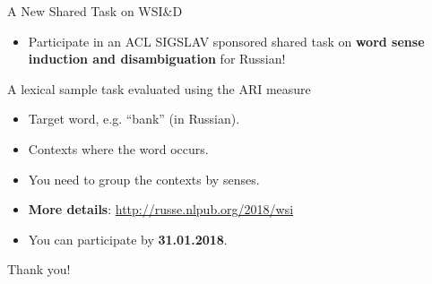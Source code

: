 \documentclass{beamer}
\begin{document}
\begin{frame}{A New Shared Task on WSI\&D}
  
  \begin{itemize}
  \item Participate in an ACL SIGSLAV sponsored shared task on \textbf{word sense induction and disambiguation} for Russian!
  
  
 \end{itemize} 
  
  \begin{block}{A lexical sample task evaluated using the ARI measure }
  \begin{itemize}
  	\item Target word, e.g. ``bank'' (in Russian).
  	\item Contexts where the word occurs.
  	\item You need to group the contexts by senses.
  \end{itemize}
   \end{block}
  
  \pause
  \begin{itemize}
    \item \textbf{More details}: \url{http://russe.nlpub.org/2018/wsi}
  \item You can participate by \textbf{31.01.2018}.
     
  \end{itemize}
  
\end{frame}

\begin{frame}{}
\Huge{Thank you!}
\end{frame}



\end{document}
